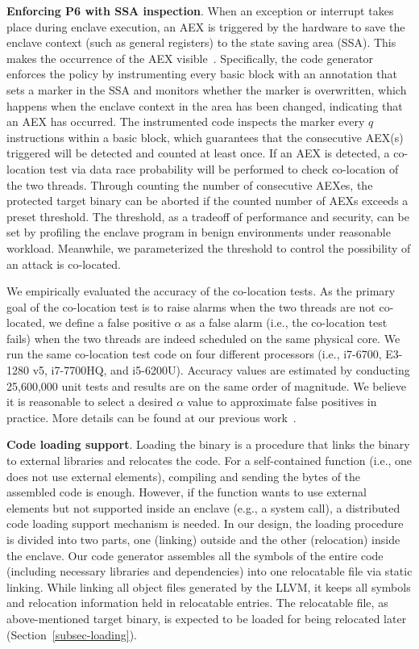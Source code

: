 \vspace{3pt}\noindent\textbf{Enforcing P6 with SSA inspection}. When an exception or interrupt takes place during enclave execution, an AEX is triggered by the hardware to save the enclave context (such as general registers) to the state saving area (SSA). This makes the occurrence of the AEX visible~\cite{gruss2017strong,chen2018racing}. Specifically, the code generator enforces the policy by instrumenting every basic block with an annotation that sets a marker in the SSA and monitors whether the marker is overwritten, which happens when the enclave context in the area has been changed, indicating that an AEX has occurred. 
The instrumented code inspects the marker every $q$ instructions within a basic block, which guarantees that the consecutive AEX(s) triggered will be detected and counted at least once. If an AEX is detected, a co-location test via data race probability will be performed to check co-location of the two threads.
Through counting the number of consecutive AEXes, the protected target binary can be aborted if the counted number of AEXs exceeds a preset threshold. The threshold, as a tradeoff of performance and security, can be set by profiling the enclave program in benign environments under reasonable workload.  Meanwhile, we parameterized the threshold to control the possibility of an attack is co-located.

We empirically evaluated the accuracy of the co-location tests. As the primary goal of the co-location test is to raise alarms when the two threads are not co-located, we define a false positive $\alpha$ as a false alarm (i.e., the co-location test fails) when the two threads are indeed scheduled on the same physical core.
We run the same co-location test code on four different processors (i.e., i7-6700,
E3-1280 v5, i7-7700HQ, and i5-6200U).  Accuracy values are estimated by conducting 25,600,000 unit tests and results are on the same order of magnitude. We believe it is reasonable to select a desired $\alpha$ value to approximate false positives in practice. More details can be found at our previous work~\cite{chen2018racing}.


\vspace{3pt}\noindent\textbf{Code loading support}.\label{subsec:code-loading-support}
Loading the binary is a procedure that links the binary to external libraries and relocates the code. 
For a self-contained function (i.e., one does not use external elements), compiling and sending the bytes of the assembled code is enough. However, if the function wants to use external elements but not supported inside an enclave (e.g., a system call), a distributed code loading support mechanism is needed. In our design, the loading procedure is divided into two parts, one (linking) outside and the other (relocation) inside the enclave.
Our code generator assembles all the symbols of the entire code (including necessary libraries and dependencies) into one relocatable file via static linking. While linking all object files generated by the LLVM, it keeps all symbols and relocation information held in relocatable entries. 
The relocatable file, as above-mentioned target binary, is expected to be loaded for being relocated later (Section~\ref{subsec-loading}).

